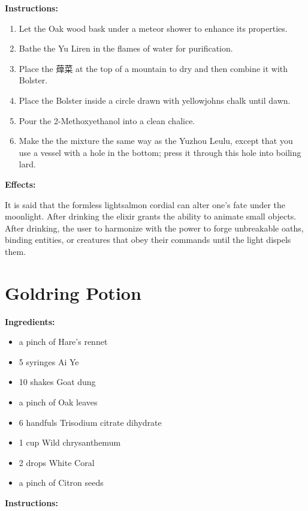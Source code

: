 \documentclass{article}
\begin{document}
\textbf{Instructions:}

\begin{enumerate}
  \item Let the Oak wood bask under a meteor shower to enhance its properties.
  \item Bathe the Yu Liren in the flames of water for purification.
  \item Place the 蔊菜 at the top of a mountain to dry and then combine it with Bolster.
  \item Place the Bolster inside a circle drawn with yellowjohns chalk until dawn.
  \item Pour the 2-Methoxyethanol into a clean chalice.
  \item Make the the mixture the same way as the Yuzhou Leulu, except that you use a vessel with a hole in the bottom; press it through this hole into boiling lard.
\end{enumerate}

\textbf{Effects:}

It is said that the formless lightsalmon cordial can alter one's fate under the moonlight. After drinking the elixir grants the ability to animate small objects. After drinking, the user to harmonize with the power to forge unbreakable oaths, binding entities, or creatures that obey their commands until the light dispels them.

\newpage
\section*{Goldring Potion}

\textbf{Ingredients:}

\begin{itemize}
  \item a pinch of Hare's rennet
  \item 5 syringes Ai Ye
  \item 10 shakes Goat dung
  \item a pinch of Oak leaves
  \item 6 handfuls Trisodium citrate dihydrate
  \item 1 cup Wild chrysanthemum
  \item 2 drops White Coral
  \item a pinch of Citron seeds
\end{itemize}

\textbf{Instructions:}
\end{document}

